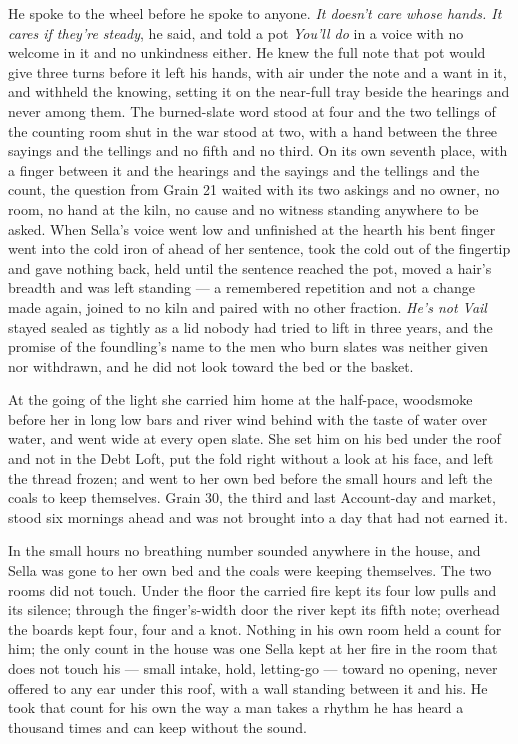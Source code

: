 He spoke to the wheel before he spoke to anyone. \emph{It doesn't care whose hands. It cares if they're steady}, he said, and told a pot \emph{You'll do} in a voice with no welcome in it and no unkindness either. He knew the full note that pot would give three turns before it left his hands, with air under the note and a want in it, and withheld the knowing, setting it on the near-full tray beside the hearings and never among them. The burned-slate word stood at four and the two tellings of the counting room shut in the war stood at two, with a hand between the three sayings and the tellings and no fifth and no third. On its own seventh place, with a finger between it and the hearings and the sayings and the tellings and the count, the question from Grain 21 waited with its two askings and no owner, no room, no hand at the kiln, no cause and no witness standing anywhere to be asked. When Sella's voice went low and unfinished at the hearth his bent finger went into the cold iron of  ahead of her sentence, took the cold out of the fingertip and gave nothing back, held until the sentence reached the pot, moved a hair's breadth and was left standing --- a remembered repetition and not a change made again, joined to no kiln and paired with no other fraction. \emph{He's not Vail} stayed sealed as tightly as a lid nobody had tried to lift in three years, and the promise of the foundling's name to the men who burn slates was neither given nor withdrawn, and he did not look toward the bed or the basket.

At the going of the light she carried him home at the half-pace, woodsmoke before her in long low bars and river wind behind with the taste of water over water, and went wide at every open slate. She set him on his bed under the roof and not in the Debt Loft, put the fold right without a look at his face, and left the thread frozen; and went to her own bed before the small hours and left the coals to keep themselves. Grain 30, the third and last Account-day and market, stood six mornings ahead and was not brought into a day that had not earned it.

\scenebreak

In the small hours no breathing number sounded anywhere in the house, and Sella was gone to her own bed and the coals were keeping themselves. The two rooms did not touch. Under the floor the carried fire kept its four low pulls and its silence; through the finger's-width door the river kept its fifth note; overhead the boards kept four, four and a knot. Nothing in his own room held a count for him; the only count in the house was one Sella kept at her fire in the room that does not touch his --- small intake, hold, letting-go --- toward no opening, never offered to any ear under this roof, with a wall standing between it and his. He took that count for his own the way a man takes a rhythm he has heard a thousand times and can keep without the sound.

